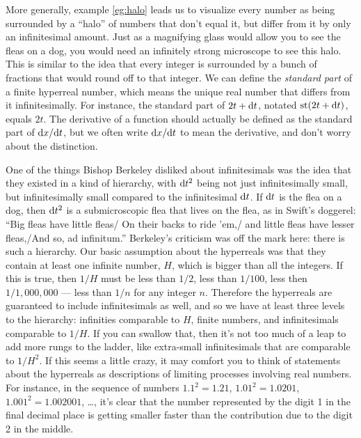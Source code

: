 More generally, example \ref{eg:halo} leads us to visualize every number as being surrounded by
a ``halo''
of numbers that don't equal it, but differ from it by only an infinitesimal amount.
Just as a magnifying glass would allow you to see the fleas on a dog, you would need an infinitely
strong microscope to see this halo. This is similar to the idea that every integer is surrounded by a bunch of fractions that
would round off to that integer. We can define the \emph{standard part} of a finite hyperreal
number, which means the unique real number that differs from it infinitesimally. For instance, the
standard part of $2t+\textup{d} t$, notated $\textup{st}(2t+\textup{d} t)$, equals $2t$. The derivative of a function
should actually be defined as the standard part of $\textup{d} x/\textup{d} t$, but we often write $\textup{d} x/\textup{d} t$
to mean the derivative, and don't worry about the distinction.

One of the things Bishop Berkeley disliked about infinitesimals was the idea that
they existed in a kind of hierarchy, with $\textup{d} t^2$ being not just infinitesimally small, but infinitesimally
small compared to the infinitesimal $\textup{d} t$.
If $\textup{d} t$ is the flea on a dog, then $\textup{d} t^2$ is a submicroscopic
flea that lives on the flea, as in Swift's doggerel: ``Big fleas have little fleas/ On their backs to ride 'em,/
and little fleas have lesser fleas,/And so, ad infinitum.'' Berkeley's criticism was off the mark here: there is
such a hierarchy. Our basic assumption about the hyperreals was that they contain at least one infinite number,
$H$, which is bigger than all the integers. If this is true, then $1/H$ must be less than $1/2$, less than
$1/100$, less then $1/1,000,000$ --- less than $1/n$ for any integer $n$. Therefore the hyperreals are guaranteed
to include infinitesimals as well, and so we have at least three levels to the hierarchy: infinities comparable
to $H$, finite numbers, and infinitesimals comparable to $1/H$. If you can swallow that, then it's not too much
of a leap to add more rungs to the ladder, like extra-small infinitesimals that are comparable to $1/H^2$.
If this seems a little crazy, it may comfort you to think of statements about the hyperreals as descriptions
of limiting processes involving real numbers. For instance, in the sequence of numbers $1.1^2=1.21$,
$1.01^2=1.0201$, $1.001^2=1.002001$, \ldots, it's clear that the number represented by the digit 1 in the final decimal place is getting
smaller faster than the contribution due to the digit 2 in the middle.

